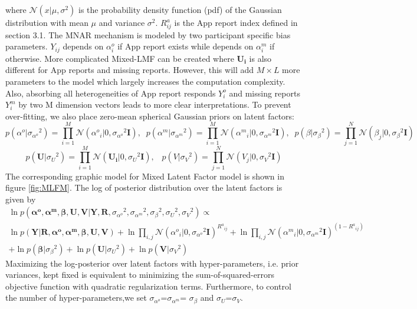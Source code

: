 \documentclass[preprint,12pt]{elsarticle}
\begin{document}
where $\mathcal{N}(x|\mu,\sigma^2)$ is the probability density function (pdf) of the Gaussian distribution with mean $\mu$ and variance $\sigma^2$. $R^a_{ij}$ is the App report index defined in section 3.1. The MNAR mechanism is modeled by two participant specific bias parameters. $Y_{ij}$ depends on $\alpha ^o_i$ if App report exists while depends on $\alpha ^m_i$ if otherwise. More complicated Mixed-LMF can be created where $\mathbf{U_i}$ is also different for App reports and missing reports. However, this will add $M\times L$ more parameters to the model which largely increases the computation complexity. Also, absorbing all heterogeneities of App report responds $Y^o_i$ and missing reports $Y^m_i$ by two M dimension vectors leads to more clear interpretations. To prevent over-fitting, we also place zero-mean spherical Gaussian priors on latent factors:
\[p({\alpha ^o}|{\sigma _{{\alpha ^o}}}^2) = \prod\limits_{i = 1}^M {\mathcal{N}({\alpha ^o}_i|0,{\sigma _{{\alpha ^o}}}^2{\mathbf{I}})} ,\;\;p({\alpha ^m}|{\sigma _{{\alpha ^m}}}^2) = \prod\limits_{i = 1}^M {\mathcal{N}({\alpha ^m}_i|0,{\sigma _{{\alpha ^m}}}^2{\mathbf{I}})} ,\;\;p(\beta |{\sigma _\beta }^2) = \prod\limits_{j = 1}^N {\mathcal{N}({\beta _j}|0,{\sigma _\beta }^2{\mathbf{I}})} \]
\[p({\mathbf{U}}|{\sigma _U}^2) = \prod\limits_{i = 1}^M {\mathcal{N}({{\mathbf{U}}_{\mathbf{i}}}|0,{\sigma _U}^2{\mathbf{I}})} ,\;\;\;p(V|{\sigma _V}^2) = \prod\limits_{j = 1}^N {\mathcal{N}({V_j}|0,{\sigma _V}^2{\mathbf{I}})} \]
The corresponding graphic model for Mixed Latent Factor model is shown in figure \ref{fig:MLFM}. The log of posterior distribution over the latent factors is given by
\begin{multline*}
\ln p({{\mathbf{\alpha }}^{\mathbf{o}}}{\mathbf{,}}{{\mathbf{\alpha }}^{\mathbf{m}}}{\mathbf{,\beta ,U,V}}|{\mathbf{Y,R}},{\sigma _{{\alpha ^o}}}^2,{\sigma _{{\alpha ^m}}}^2,{\sigma _\beta }^2,{\sigma _U}^2,{\sigma _V}^2) \propto \\
\ln p({\mathbf{Y}}|{\mathbf{R}},{{\mathbf{\alpha }}^{\mathbf{o}}}{\mathbf{,}}{{\mathbf{\alpha }}^{\mathbf{m}}}{\mathbf{,\beta ,U,V}}) + \ln \prod\limits_{i,j} {\mathcal{N}{{({\alpha ^o}_i|0,{\sigma _{{\alpha ^o}}}^2{\mathbf{I}})}^{{R^a}_{ij}}}}  + \ln \prod\limits_{i,j} {\mathcal{N}{{({\alpha ^m}_i|0,{\sigma _{{\alpha ^m}}}^2{\mathbf{I}})}^{(1 - {R^a}_{ij})}}} \\
 + \ln p({\mathbf{\beta }}|{\sigma _\beta }^2) + \ln p({\mathbf{U}}|{\sigma _U}^2) + \ln p({\mathbf{V}}|{\sigma _V}^2)
\end{multline*}
Maximizing the log-posterior over latent factors with hyper-parameters, i.e. prior variances, kept fixed is equivalent to minimizing the sum-of-squared-errors objective function with quadratic regularization terms. Furthermore, to control the number of hyper-parameters,we set $\sigma_{\alpha^o}$=$\sigma_{\alpha^m}$= $\sigma_{\beta}$ and $\sigma_U$=$\sigma_V$.
\end{document}
